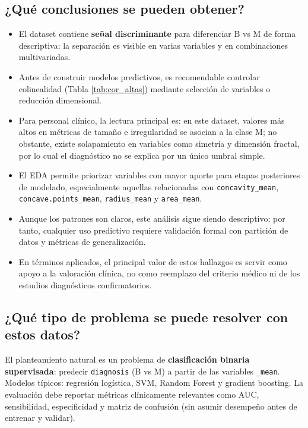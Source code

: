 \documentclass[12pt,a4paper]{article}
\begin{document}
\subsection{¿Qué conclusiones se pueden obtener?}
\begin{itemize}
    \item El dataset contiene \textbf{señal discriminante} para diferenciar B vs M de forma descriptiva: la separación es visible en varias variables y en combinaciones multivariadas.
    \item Antes de construir modelos predictivos, es recomendable controlar colinealidad (Tabla \ref{tab:cor_altas}) mediante selección de variables o reducción dimensional.
    \item Para personal clínico, la lectura principal es: en este dataset, valores más altos en métricas de tamaño e irregularidad se asocian a la clase M; no obstante, existe solapamiento en variables como simetría y dimensión fractal, por lo cual el diagnóstico no se explica por un único umbral simple.
    \item El EDA permite priorizar variables con mayor aporte para etapas posteriores de modelado, especialmente aquellas relacionadas con \texttt{concavity\_mean}, \texttt{concave.points\_mean}, \texttt{radius\_mean} y \texttt{area\_mean}.
    \item Aunque los patrones son claros, este análisis sigue siendo descriptivo; por tanto, cualquier uso predictivo requiere validación formal con partición de datos y métricas de generalización.
    \item En términos aplicados, el principal valor de estos hallazgos es servir como apoyo a la valoración clínica, no como reemplazo del criterio médico ni de los estudios diagnósticos confirmatorios.
\end{itemize}

\subsection{¿Qué tipo de problema se puede resolver con estos datos?}
El planteamiento natural es un problema de \textbf{clasificación binaria supervisada}: predecir \texttt{diagnosis} (B vs M) a partir de las variables \texttt{\_mean}.\\
Modelos típicos: regresión logística, SVM, Random Forest y gradient boosting. La evaluación debe reportar métricas clínicamente relevantes como AUC, sensibilidad, especificidad y matriz de confusión (sin asumir desempeño antes de entrenar y validar).
\end{document}
